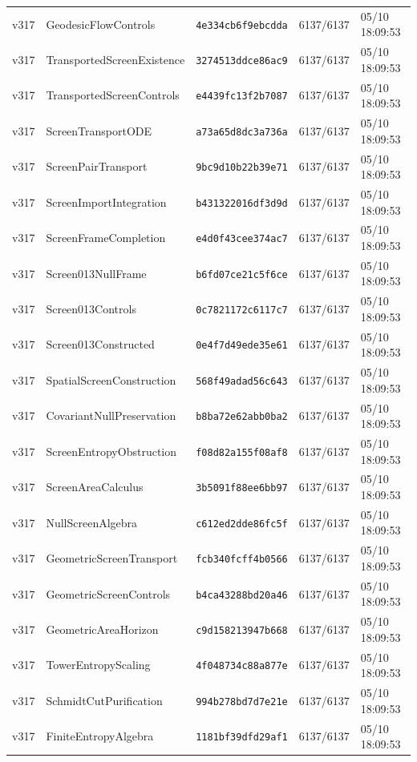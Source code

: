 \documentclass[11pt]{article}
\theoremstyle{definition}\newtheorem{deriv}{Derivation}
\begin{document}
{\begin{longtable}{@{}lllll@{}}
v317 & GeodesicFlowControls & \texttt{4e334cb6f9ebcdda} & 6137/6137 & 05/10 18:09:53 \\
v317 & TransportedScreenExistence & \texttt{3274513ddce86ac9} & 6137/6137 & 05/10 18:09:53 \\
v317 & TransportedScreenControls & \texttt{e4439fc13f2b7087} & 6137/6137 & 05/10 18:09:53 \\
v317 & ScreenTransportODE & \texttt{a73a65d8dc3a736a} & 6137/6137 & 05/10 18:09:53 \\
v317 & ScreenPairTransport & \texttt{9bc9d10b22b39e71} & 6137/6137 & 05/10 18:09:53 \\
v317 & ScreenImportIntegration & \texttt{b431322016df3d9d} & 6137/6137 & 05/10 18:09:53 \\
v317 & ScreenFrameCompletion & \texttt{e4d0f43cee374ac7} & 6137/6137 & 05/10 18:09:53 \\
v317 & Screen013NullFrame & \texttt{b6fd07ce21c5f6ce} & 6137/6137 & 05/10 18:09:53 \\
v317 & Screen013Controls & \texttt{0c7821172c6117c7} & 6137/6137 & 05/10 18:09:53 \\
v317 & Screen013Constructed & \texttt{0e4f7d49ede35e61} & 6137/6137 & 05/10 18:09:53 \\
v317 & SpatialScreenConstruction & \texttt{568f49adad56c643} & 6137/6137 & 05/10 18:09:53 \\
v317 & CovariantNullPreservation & \texttt{b8ba72e62abb0ba2} & 6137/6137 & 05/10 18:09:53 \\
v317 & ScreenEntropyObstruction & \texttt{f08d82a155f08af8} & 6137/6137 & 05/10 18:09:53 \\
v317 & ScreenAreaCalculus & \texttt{3b5091f88ee6bb97} & 6137/6137 & 05/10 18:09:53 \\
v317 & NullScreenAlgebra & \texttt{c612ed2dde86fc5f} & 6137/6137 & 05/10 18:09:53 \\
v317 & GeometricScreenTransport & \texttt{fcb340fcff4b0566} & 6137/6137 & 05/10 18:09:53 \\
v317 & GeometricScreenControls & \texttt{b4ca43288bd20a46} & 6137/6137 & 05/10 18:09:53 \\
v317 & GeometricAreaHorizon & \texttt{c9d158213947b668} & 6137/6137 & 05/10 18:09:53 \\
v317 & TowerEntropyScaling & \texttt{4f048734c88a877e} & 6137/6137 & 05/10 18:09:53 \\
v317 & SchmidtCutPurification & \texttt{994b278bd7d7e21e} & 6137/6137 & 05/10 18:09:53 \\
v317 & FiniteEntropyAlgebra & \texttt{1181bf39dfd29af1} & 6137/6137 & 05/10 18:09:53 \\

\end{longtable}}
\end{document}
